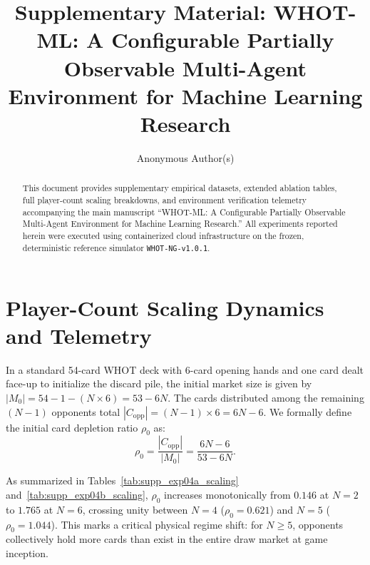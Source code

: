 \documentclass[journal]{IEEEtran}
\begin{document}
\nocite{cliff1993dominance,wilson1927probable,schulman2017proximal}

\title{Supplementary Material: WHOT-ML: A Configurable Partially Observable Multi-Agent Environment for Machine Learning Research}

\author{Anonymous Author(s)}

\maketitle

\begin{abstract}
This document provides supplementary empirical datasets, extended ablation tables, full player-count scaling breakdowns, and environment verification telemetry accompanying the main manuscript ``WHOT-ML: A Configurable Partially Observable Multi-Agent Environment for Machine Learning Research.'' All experiments reported herein were executed using containerized cloud infrastructure on the frozen, deterministic reference simulator \texttt{WHOT-NG-v1.0.1}.
\end{abstract}

\section{Player-Count Scaling Dynamics and Telemetry}
\label{sec:supp_player_scaling}

In a standard 54-card WHOT deck with 6-card opening hands and one card dealt face-up to initialize the discard pile, the initial market size is given by $|M_0| = 54 - 1 - (N \times 6) = 53 - 6N$. The cards distributed among the remaining $(N - 1)$ opponents total $|C_{\text{opp}}| = (N - 1) \times 6 = 6N - 6$. We formally define the initial card depletion ratio $\rho_0$ as:
\begin{equation}
\rho_0 = \frac{|C_{\text{opp}}|}{|M_0|} = \frac{6N - 6}{53 - 6N}.
\end{equation}

As summarized in Tables~\ref{tab:supp_exp04a_scaling} and~\ref{tab:supp_exp04b_scaling}, $\rho_0$ increases monotonically from $0.146$ at $N=2$ to $1.765$ at $N=6$, crossing unity between $N=4$ ($\rho_0 = 0.621$) and $N=5$ ($\rho_0 = 1.044$). This marks a critical physical regime shift: for $N \ge 5$, opponents collectively hold more cards than exist in the entire draw market at game inception.
\end{document}
